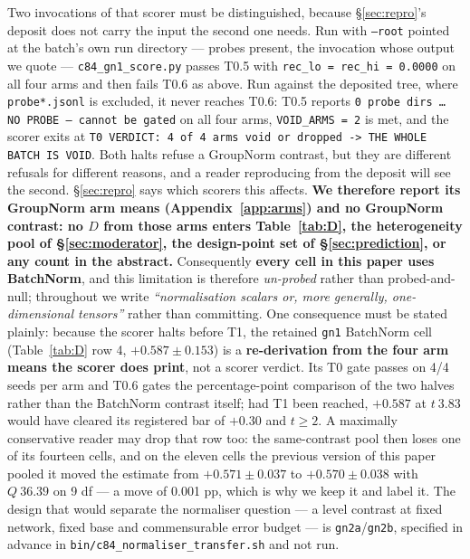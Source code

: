 \documentclass[10pt,letterpaper]{article}
\newcommand{\Dstat}{D}                         %
\newcommand{\arm}[1]{\texttt{#1}}
\begin{document}
Two invocations of that scorer must be distinguished, because \S\ref{sec:repro}'s deposit does not
carry the input the second one needs. Run with \texttt{--root} pointed at the batch's own run
directory --- probes present, the invocation whose output we quote ---
\texttt{c84\_gn1\_score.py} passes T0.5 with \texttt{rec\_lo = rec\_hi = 0.0000} on all four arms
and then fails T0.6 as above. Run against the deposited tree, where \texttt{probe*.jsonl} is
excluded, it never reaches T0.6: T0.5 reports \texttt{0 probe dirs \ldots{} NO PROBE -- cannot be
gated} on all four arms, \texttt{VOID\_ARMS = 2} is met, and the scorer exits at
\texttt{T0 VERDICT: 4 of 4 arms void or dropped -> THE WHOLE BATCH IS VOID}. Both halts refuse a
GroupNorm contrast, but they are different refusals for different reasons, and a reader
reproducing from the deposit will see the second. \S\ref{sec:repro} says which scorers this
affects. \textbf{We therefore report its GroupNorm arm means
(Appendix~\ref{app:arms}) and no GroupNorm contrast: no $\Dstat$ from those arms enters
Table~\ref{tab:D}, the heterogeneity pool of \S\ref{sec:moderator}, the design-point set of
\S\ref{sec:prediction}, or any count in the abstract.} Consequently \textbf{every cell in this
paper uses BatchNorm}, and this limitation is therefore \emph{un-probed} rather than
probed-and-null; throughout we write \emph{``normalisation scalars or, more generally,
one-dimensional tensors''} rather than committing. One consequence must be stated plainly: because
the scorer halts before T1, the retained \arm{gn1} BatchNorm cell (Table~\ref{tab:D} row 4,
$+0.587 \pm 0.153$) is a \textbf{re-derivation from the four arm means the scorer does print}, not
a scorer verdict. Its T0 gate passes on 4/4 seeds per arm and T0.6 gates the percentage-point
comparison of the two halves rather than the BatchNorm contrast itself; had T1 been reached,
$+0.587$ at $t\ 3.83$ would have cleared its registered bar of $+0.30$ and $t \ge 2$. A maximally
conservative reader may drop that row too: the same-contrast pool then loses one of its fourteen
cells, and on the eleven cells the previous version of this paper pooled it moved the estimate from
$+0.571 \pm 0.037$ to $+0.570 \pm 0.038$ with $Q\ 36.39$ on 9 df --- a move of 0.001 pp, which is
why we keep it and label it. The design that would separate the normaliser question --- a level contrast at fixed
network, fixed base and commensurable error budget --- is \arm{gn2a}/\arm{gn2b}, specified in
advance in \texttt{bin/c84\_normaliser\_transfer.sh} and not run.
\end{document}

